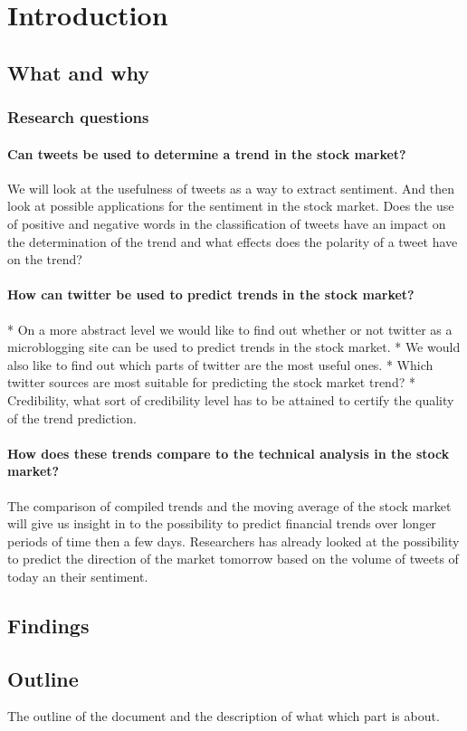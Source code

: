 \section{Introduction}

\subsection{What and why}

\subsubsection{Research questions}
	\paragraph{Can tweets be used to determine a trend in the stock market?}
	We will look at the usefulness of tweets as a way to extract sentiment. And
then look at possible applications for the sentiment in the stock market. 
Does the use of positive and negative words in the classification of tweets
have an impact on the determination of the trend and what effects does the
polarity of a tweet have on the trend?
	\paragraph{How can twitter be used to predict trends in the stock market?}
* On a more abstract level we would like to find out whether or not twitter as a
microblogging site can be used to predict trends in the stock market. 
* We would also like to find out which parts of twitter are the most useful ones. 
* Which twitter sources are most suitable for predicting the stock market
trend?
* Credibility, what sort of credibility level has to be attained to certify the
quality of the trend prediction.  
	\paragraph{How does these trends compare to the technical analysis in the stock market?}
	The comparison of compiled trends and the moving average of the stock
market will  give us insight in to the possibility to predict financial trends
over longer periods of time then a few days. Researchers has already looked at
the possibility to predict the direction of the market tomorrow based on the
volume of tweets of today an their sentiment. 

\subsection{Findings}

\subsection{Outline}
The outline of the document and the description of what which part is about. 


